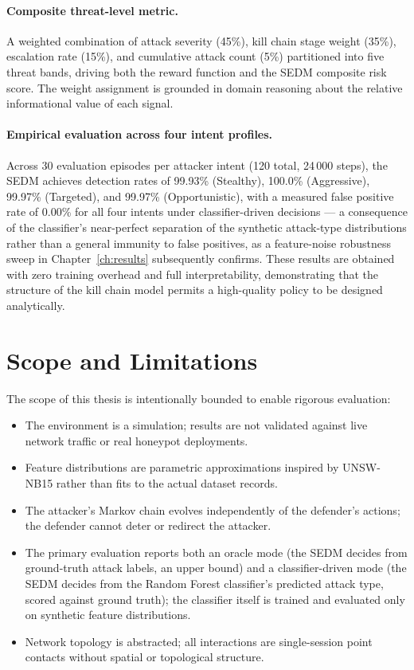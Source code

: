 \paragraph{Composite threat-level metric.}
A weighted combination of attack severity (45\%), kill chain stage weight
(35\%), escalation rate (15\%), and cumulative attack count (5\%) partitioned
into five threat bands, driving both the reward function and the SEDM
composite risk score.
The weight assignment is grounded in domain reasoning about the relative
informational value of each signal.

\paragraph{Empirical evaluation across four intent profiles.}
Across 30 evaluation episodes per attacker intent (120 total, 24\,000 steps),
the SEDM achieves detection rates of 99.93\% (Stealthy), 100.0\% (Aggressive),
99.97\% (Targeted), and 99.97\% (Opportunistic), with a measured false
positive rate of 0.00\% for all four intents under classifier-driven
decisions --- a consequence of the classifier's near-perfect separation of
the synthetic attack-type distributions rather than a general immunity to
false positives, as a feature-noise robustness sweep in
Chapter~\ref{ch:results} subsequently confirms.
These results are obtained with zero training overhead and full interpretability,
demonstrating that the structure of the kill chain model permits a high-quality
policy to be designed analytically.

\section{Scope and Limitations}

The scope of this thesis is intentionally bounded to enable rigorous evaluation:

\begin{itemize}
  \item The environment is a simulation; results are not validated against
        live network traffic or real honeypot deployments.
  \item Feature distributions are parametric approximations inspired by
        UNSW-NB15 rather than fits to the actual dataset records.
  \item The attacker's Markov chain evolves independently of the defender's
        actions; the defender cannot deter or redirect the attacker.
  \item The primary evaluation reports both an oracle mode (the SEDM decides
        from ground-truth attack labels, an upper bound) and a
        classifier-driven mode (the SEDM decides from the Random Forest
        classifier's predicted attack type, scored against ground truth);
        the classifier itself is trained and evaluated only on synthetic
        feature distributions.
  \item Network topology is abstracted; all interactions are single-session
        point contacts without spatial or topological structure.
\end{itemize}

